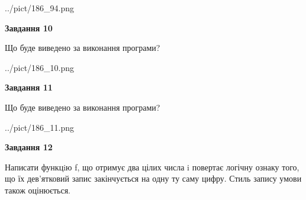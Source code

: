 \documentclass[12pt, ukrainian]{article}
\begin{document}
{\begin {large}
\begin{center}
	{../pict/186_94.png}
\end{center}
\newpage

{\begin {center}\textbf{Завдання 10}\end {center}}

Що буде виведено за виконання програми?\par
\begin{center}
	{../pict/186_10.png}
\end{center}
\newpage

{\begin {center}\textbf{Завдання 11}\end {center}}

Що буде виведено за виконання програми?\par
\begin{center}
	{../pict/186_11.png}
\end{center}
\newpage

{\begin {center}\textbf{Завдання 12}\end {center}}


Написати функцiю f, що отримує два цілих числа i повертає логічну ознаку того, що їх дев'ятковий запис закінчується на одну ту саму цифру. Стиль запису умови також оцінюється.\par
\newpage

\end {large}}
\end{document}
